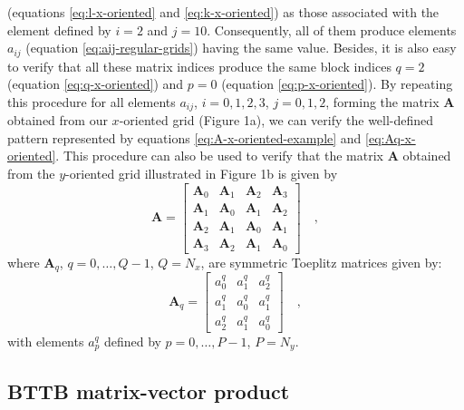 \documentclass[manuscript,revised]{geophysics}
\begin{document}
(equations \ref{eq:l-x-oriented} and \ref{eq:k-x-oriented}) as those associated with
the element defined by $i = 2$ and $j = 10$. Consequently, all of them produce
elements $a_{ij}$ (equation \ref{eq:aij-regular-grids}) having the same value.
Besides, it is also easy to verify that all these matrix indices produce the same block
indices $q = 2$ (equation \ref{eq:q-x-oriented}) and $p = 0$ (equation \ref{eq:p-x-oriented}).
By repeating this procedure for all elements $a_{ij}$, $i = 0, 1, 2, 3$, $j = 0, 1, 2$, 
forming the matrix $\mathbf{A}$ obtained from our $x$-oriented grid (Figure 1a),
we can verify the well-defined pattern represented by equations 
\ref{eq:A-x-oriented-example} and \ref{eq:Aq-x-oriented}.
This procedure can also be used to verify that the matrix $\mathbf{A}$ obtained
from the $y$-oriented grid illustrated in Figure 1b is given by
\begin{equation}
\mathbf{A} = \begin{bmatrix}
\mathbf{A}_{0} & \mathbf{A}_{1} & \mathbf{A}_{2} & \mathbf{A}_{3} \\
\mathbf{A}_{1} & \mathbf{A}_{0} & \mathbf{A}_{1} & \mathbf{A}_{2} \\
\mathbf{A}_{2} & \mathbf{A}_{1} & \mathbf{A}_{0} & \mathbf{A}_{1} \\
\mathbf{A}_{3} & \mathbf{A}_{2} & \mathbf{A}_{1} & \mathbf{A}_{0}
\end{bmatrix} \quad ,
\label{eq:A-y-oriented-example}
\end{equation}
where $\mathbf{A}_{q}$, $q = 0, \dots, Q - 1$, $Q = N_{x}$, 
are symmetric Toeplitz matrices given by:
\begin{equation}
\mathbf{A}_{q} = \begin{bmatrix}
a^{q}_{0} & a^{q}_{1} & a^{q}_{2} \\
a^{q}_{1} & a^{q}_{0} & a^{q}_{1} \\
a^{q}_{2} & a^{q}_{1} & a^{q}_{0}
\end{bmatrix} \quad ,
\label{eq:Aq-y-oriented}
\end{equation}
with elements $a^{q}_{p}$ defined by $p = 0, \dots, P - 1$, $P = N_{y}$.

\subsection{BTTB matrix-vector product}
\end{document}
